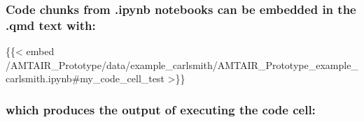 \documentclass[
  11pt,
  letterpaper,
]{book}
\newenvironment{Shaded}{\begin{snugshade}}{\end{snugshade}}
\newcommand{\NormalTok}[1]{\textcolor[rgb]{0.00,0.23,0.31}{#1}}
\begin{document}
\subsubsection{Code chunks from .ipynb notebooks can be embedded in the
.qmd text
with:}\label{code-chunks-from-.ipynb-notebooks-can-be-embedded-in-the-.qmd-text-with}

\begin{Shaded}
\begin{Highlighting}[]
\NormalTok{\{\{\textless{} embed /AMTAIR\_Prototype/data/example\_carlsmith/AMTAIR\_Prototype\_example\_carlsmith.ipynb\#my\_code\_cell\_test \textgreater{}\}\}}
\end{Highlighting}
\end{Shaded}

\subsubsection{which produces the output of executing the code
cell:}\label{which-produces-the-output-of-executing-the-code-cell}
\end{document}
